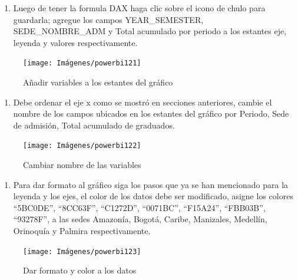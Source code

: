 \documentclass[
]{book}
\providecommand{\tightlist}{%
  \setlength{\itemsep}{0pt}\setlength{\parskip}{0pt}}
\begin{document}
\begin{enumerate}
\def\labelenumi{\arabic{enumi}.}
\setcounter{enumi}{3}
\tightlist
\item
  Luego de tener la formula DAX haga clic sobre el icono de chulo para guardarla; agregue los campos YEAR\_SEMESTER, SEDE\_NOMBRE\_ADM y Total acumulado por periodo a los estantes eje, leyenda y valores respectivamente.
\end{enumerate}

\begin{figure}

{\centering \texttt{[image: Imágenes/powerbi121]} 

}

\caption{Añadir variables a los estantes del gráfico}\label{fig:paso4graficoareas-fig}
\end{figure}

\begin{enumerate}
\def\labelenumi{\arabic{enumi}.}
\setcounter{enumi}{4}
\tightlist
\item
  Debe ordenar el eje x como se mostró en secciones anteriores, cambie el nombre de los campos ubicados en los estantes del gráfico por Periodo, Sede de admisión, Total acumulado de graduados.
\end{enumerate}

\begin{figure}

{\centering \texttt{[image: Imágenes/powerbi122]} 

}

\caption{Cambiar nombre de las variables}\label{fig:paso5graficoareas-fig}
\end{figure}

\begin{enumerate}
\def\labelenumi{\arabic{enumi}.}
\setcounter{enumi}{5}
\tightlist
\item
  Para dar formato al gráfico siga los pasos que ya se han mencionado para la leyenda y los ejes, el color de los datos debe ser modificado, asigne los colores ``5BC0DE'', ``8CC63F'', ``C1272D'', ``0071BC'', ``F15A24'', ``FBB03B'', ``93278F'', a las sedes Amazonía, Bogotá, Caribe, Manizales, Medellín, Orinoquía y Palmira respectivamente.
\end{enumerate}

\begin{figure}

{\centering \texttt{[image: Imágenes/powerbi123]} 

}

\caption{Dar formato y color a los datos}\label{fig:paso6graficoareas-fig}
\end{figure}
\end{document}
